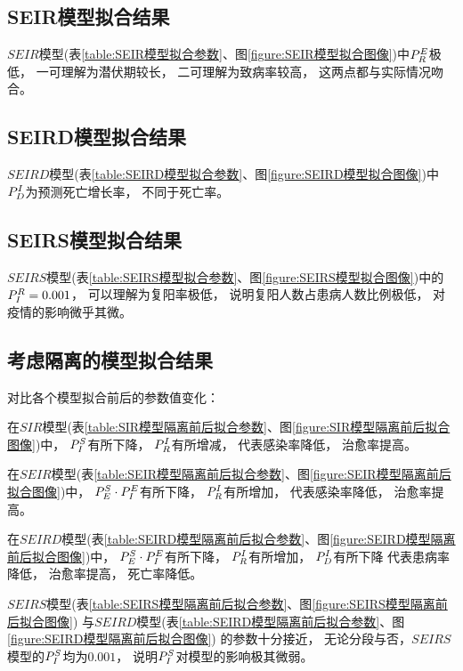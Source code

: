 \subsection{SEIR模型拟合结果}
\par $SEIR$模型(表\ref{table:SEIR模型拟合参数}、图\ref{figure:SEIR模型拟合图像})中$\P{E}{R}$极低，
一可理解为潜伏期较长，
二可理解为致病率较高，
这两点都与实际情况吻合。
\subsection{SEIRD模型拟合结果}
\par $SEIRD$模型(表\ref{table:SEIRD模型拟合参数}、图\ref{figure:SEIRD模型拟合图像})中$\P{I}{D}$为预测死亡增长率，
不同于死亡率。
\subsection{SEIRS模型拟合结果}
\par $SEIRS$模型(表\ref{table:SEIRS模型拟合参数}、图\ref{figure:SEIRS模型拟合图像})中的$\P{R}{I}=0.001$，
可以理解为复阳率极低，
说明复阳人数占患病人数比例极低，
对疫情的影响微乎其微。
\subsection{考虑隔离的模型拟合结果}
\par 对比各个模型拟合前后的参数值变化：
\par 在$SIR$模型(表\ref{table:SIR模型隔离前后拟合参数}、图\ref{figure:SIR模型隔离前后拟合图像})中，
$\P{S}{I}$有所下降，
$\P{I}{R}$有所增减，
代表感染率降低，
治愈率提高。
\par 在$SEIR$模型(表\ref{table:SEIR模型隔离前后拟合参数}、图\ref{figure:SEIR模型隔离前后拟合图像})中，
$\P{S}{E}\cdot \P{E}{I}$有所下降，
$\P{I}{R}$有所增加，
代表感染率降低，
治愈率提高。
\par 在$SEIRD$模型(表\ref{table:SEIRD模型隔离前后拟合参数}、图\ref{figure:SEIRD模型隔离前后拟合图像})中，
$\P{S}{E}\cdot \P{E}{I}$有所下降，
$\P{I}{R}$有所增加，
$\P{I}{D}$有所下降
代表患病率降低，
治愈率提高，
死亡率降低。
\par $SEIRS$模型(表\ref{table:SEIRS模型隔离前后拟合参数}、图\ref{figure:SEIRS模型隔离前后拟合图像})
与$SEIRD$模型(表\ref{table:SEIRD模型隔离前后拟合参数}、图\ref{figure:SEIRD模型隔离前后拟合图像})
的参数十分接近，
无论分段与否，$SEIRS$模型的$\P{S}{I}$均为$0.001$，
说明$\P{S}{I}$对模型的影响极其微弱。

